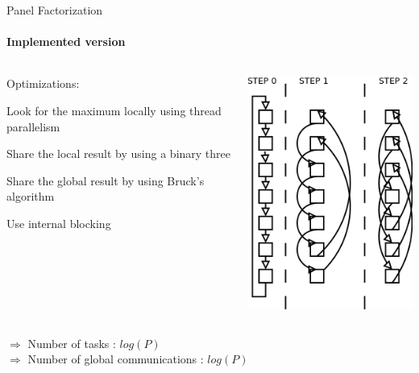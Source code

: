 \documentclass{beamer}
\begin{document}
\begin{frame}{Panel Factorization}
\framesubtitle{Implemented version}
\begin{columns}
\begin{column}{.50\textwidth}
Optimizations:
\begin{itemize}
{
\item Look for the maximum locally using thread parallelism
\item Share the local result by using a binary three}
\item Share the global result by using Bruck's algorithm
\item Use internal blocking
\end{itemize}
\end{column}
\hfill
\begin{column}{.50\textwidth}
\begin{center}
\includegraphics[scale=0.5]{bruck.png}
\end{center}
\end{column}
\end{columns}
\pause
\begin{exampleblock}{}
$\Longrightarrow$ Number of tasks : $log(P)$\\
$\Longrightarrow$ Number of global communications : $log(P)$
\end{exampleblock}{}
\end{frame}
\end{document}
